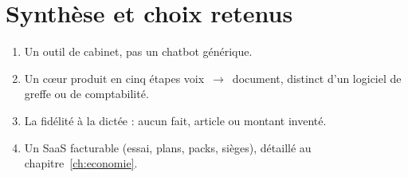 \section{Synthèse et choix retenus}

\begin{enumerate}[leftmargin=1.4em]
  \item Un outil de cabinet, pas un chatbot générique.
  \item Un cœur produit en cinq étapes voix~$\rightarrow$~document, distinct d'un logiciel de greffe ou de comptabilité.
  \item La fidélité à la dictée : aucun fait, article ou montant inventé.
  \item Un SaaS facturable (essai, plans, packs, sièges), détaillé au chapitre~\ref{ch:economie}.
\end{enumerate}
